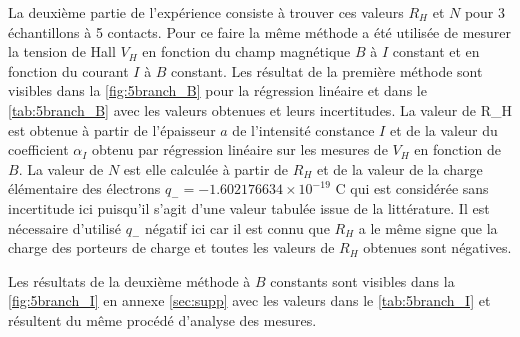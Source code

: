 La deuxième partie de l'expérience consiste à trouver ces valeurs \(R_H\) et \(N\) pour 3 échantillons à 5 contacts. Pour ce faire la même méthode a été utilisée de mesurer la tension de Hall \(V_H\) en fonction du champ magnétique \(B\) à \(I\) constant et en fonction du courant \(I\) à \(B\) constant. Les résultat de la première méthode sont visibles dans la \autoref{fig:5branch_B} pour la régression linéaire et dans le \autoref{tab:5branch_B} avec les valeurs obtenues et leurs incertitudes. La valeur de R_H est obtenue à partir de l'épaisseur \(a\) de l'intensité constance \(I\) et de la valeur du coefficient \(\alpha_I\) obtenu par régression linéaire sur les mesures de \(V_H\) en fonction de \(B\). La valeur de \(N\) est elle calculée à partir de \(R_H\) et de la valeur de la charge élémentaire des électrons \(q_- = -1.602176634\times10^{-19}\) \si{\coulomb} qui est considérée sans incertitude ici puisqu'il s'agit d'une valeur tabulée issue de la littérature. Il est nécessaire d'utilisé \(q_-\) négatif ici car il est connu que \(R_H\) a le même signe que la charge des porteurs de charge et toutes les valeurs de \(R_H\) obtenues sont négatives.

Les résultats de la deuxième méthode à \(B\) constants sont visibles dans la \autoref{fig:5branch_I} en annexe \autoref{sec:supp} avec les valeurs dans le \autoref{tab:5branch_I} et résultent du même procédé d'analyse des mesures.


